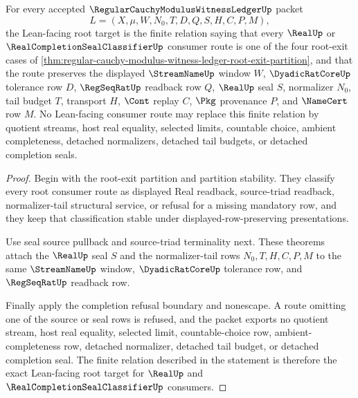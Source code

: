 \begin{theorem}
\label{thm:regular-cauchy-modulus-witness-ledger-formal-target-boundary}
For every accepted $\RegularCauchyModulusWitnessLedgerUp$ packet
$$
L=(X,\mu,W,N_0,T,D,Q,S,H,C,P,M),
$$
the Lean-facing root target is the finite relation saying that every $\RealUp$ or $\RealCompletionSealClassifierUp$ consumer route is one of the four root-exit cases of \autoref{thm:regular-cauchy-modulus-witness-ledger-root-exit-partition}, and that the route preserves the displayed $\StreamNameUp$ window $W$, $\DyadicRatCoreUp$ tolerance row $D$, $\RegSeqRatUp$ readback row $Q$, $\RealUp$ seal $S$, normalizer $N_0$, tail budget $T$, transport $H$, $\Cont$ replay $C$, $\Pkg$ provenance $P$, and $\NameCert$ row $M$. No Lean-facing consumer route may replace this finite relation by quotient streams, host real equality, selected limits, countable choice, ambient completeness, detached normalizers, detached tail budgets, or detached completion seals.
\end{theorem}
\begin{proof}
Begin with the root-exit partition and partition stability. They classify every root consumer route as displayed Real readback, source-triad readback, normalizer-tail structural service, or refusal for a missing mandatory row, and they keep that classification stable under displayed-row-preserving presentations.

Use seal source pullback and source-triad terminality next. These theorems attach the $\RealUp$ seal $S$ and the normalizer-tail rows $N_0,T,H,C,P,M$ to the same $\StreamNameUp$ window, $\DyadicRatCoreUp$ tolerance row, and $\RegSeqRatUp$ readback row.

Finally apply the completion refusal boundary and nonescape. A route omitting one of the source or seal rows is refused, and the packet exports no quotient stream, host real equality, selected limit, countable-choice row, ambient-completeness row, detached normalizer, detached tail budget, or detached completion seal. The finite relation described in the statement is therefore the exact Lean-facing root target for $\RealUp$ and $\RealCompletionSealClassifierUp$ consumers.
\end{proof}
